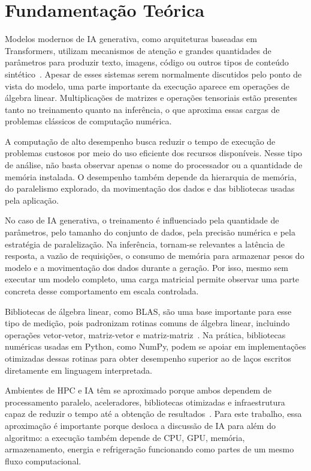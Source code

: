 \section{Fundamentação Teórica}
\label{sec:fundamentacao}

Modelos modernos de IA generativa, como arquiteturas baseadas em Transformers, utilizam mecanismos de atenção e grandes quantidades de parâmetros para produzir texto, imagens, código ou outros tipos de conteúdo sintético~\cite{vaswani2017attention,brown2020language}. Apesar de esses sistemas serem normalmente discutidos pelo ponto de vista do modelo, uma parte importante da execução aparece em operações de álgebra linear. Multiplicações de matrizes e operações tensoriais estão presentes tanto no treinamento quanto na inferência, o que aproxima essas cargas de problemas clássicos de computação numérica.

A computação de alto desempenho busca reduzir o tempo de execução de problemas custosos por meio do uso eficiente dos recursos disponíveis. Nesse tipo de análise, não basta observar apenas o nome do processador ou a quantidade de memória instalada. O desempenho também depende da hierarquia de memória, do paralelismo explorado, da movimentação dos dados e das bibliotecas usadas pela aplicação.

No caso de IA generativa, o treinamento é influenciado pela quantidade de parâmetros, pelo tamanho do conjunto de dados, pela precisão numérica e pela estratégia de paralelização. Na inferência, tornam-se relevantes a latência de resposta, a vazão de requisições, o consumo de memória para armazenar pesos do modelo e a movimentação dos dados durante a geração. Por isso, mesmo sem executar um modelo completo, uma carga matricial permite observar uma parte concreta desse comportamento em escala controlada.

Bibliotecas de álgebra linear, como BLAS, são uma base importante para esse tipo de medição, pois padronizam rotinas comuns de álgebra linear, incluindo operações vetor-vetor, matriz-vetor e matriz-matriz~\cite{blackford2002blas,netlibBlas}. Na prática, bibliotecas numéricas usadas em Python, como NumPy, podem se apoiar em implementações otimizadas dessas rotinas para obter desempenho superior ao de laços escritos diretamente em linguagem interpretada.

Ambientes de HPC e IA têm se aproximado porque ambos dependem de processamento paralelo, aceleradores, bibliotecas otimizadas e infraestrutura capaz de reduzir o tempo até a obtenção de resultados~\cite{huerta2020convergence}. Para este trabalho, essa aproximação é importante porque desloca a discussão de IA para além do algoritmo: a execução também depende de CPU, GPU, memória, armazenamento, energia e refrigeração funcionando como partes de um mesmo fluxo computacional.

